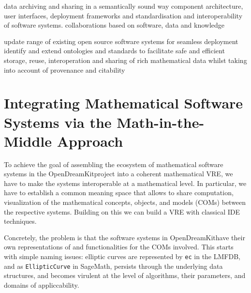 \documentclass{llncs}
\def\pn{OpenDreamKit}
\begin{document}
data archiving and sharing in a semantically sound way component architecture, user
interfaces, deployment frameworks and standardisation and interoperability of software
systems.  collaborations based on software, data and knowledge

update range of existing open source software systems for seamless deployment identify and
extend ontologies and standards to facilitate safe and efficient storage, reuse,
interoperation and sharing of rich mathematical data whilst taking into account of
provenance and citability


\section{Integrating Mathematical Software Systems via the Math-in-the-Middle Approach}



To achieve the goal of assembling the ecosystem of mathematical software systems in the
\pn project into a coherent mathematical VRE, we have to make the systems interoperable at
a mathematical level. In particular, we have to establish a common meaning space that
allows to share computation, visualization of the mathematical concepts, objects, and
models (COMs) between the respective systems. Building on this we can build a VRE with
classical IDE techniques. 

Concretely, the problem is that the software systems in \pn have their own representations
of and functionalities for the COMs involved. This starts with simple naming issues:
elliptic curves are represented by \lstinline|ec| in the LMFDB, and as
\lstinline|EllipticCurve| in SageMath, persists through the underlying data structures,
and becomes virulent at the level of algorithms, their parameters, and domains of
appliccability.


\end{document}
